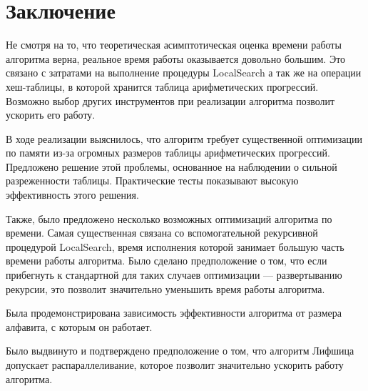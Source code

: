 \documentclass[14pt]{article}
\begin{document}
\section{Заключение}

Не смотря на то, что теоретическая асимптотическая оценка времени работы алгоритма верна, реальное время работы оказывается довольно большим. Это связано с затратами на выполнение процедуры LocalSearch а так же на операции хеш-таблицы, в которой хранится таблица арифметических прогрессий. Возможно выбор других инструментов при реализации алгоритма позволит ускорить его работу.

В ходе реализации выяснилось, что алгоритм требует существенной оптимизации по памяти из-за огромных размеров таблицы арифметических прогрессий. Предложено решение этой проблемы, основанное на наблюдении о сильной разреженности таблицы. Практические тесты показывают высокую эффективность этого решения.

Также, было предложено несколько возможных оптимизаций алгоритма по времени. Самая существенная связана со вспомогательной рекурсивной процедурой LocalSearch, время исполнения которой занимает большую часть времени работы алгоритма. Было сделано предположение о том, что если прибегнуть к стандартной для таких случаев оптимизации --- развертыванию рекурсии, это позволит значительно уменьшить время работы алгоритма.

Была продемонстрирована зависимость эффективности алгоритма от размера алфавита, с которым он работает. 

Было выдвинуто и подтверждено предположение о том, что алгоритм Лифшица допускает распараллеливание, которое позволит значительно ускорить работу алгоритма.  
\end{document}
